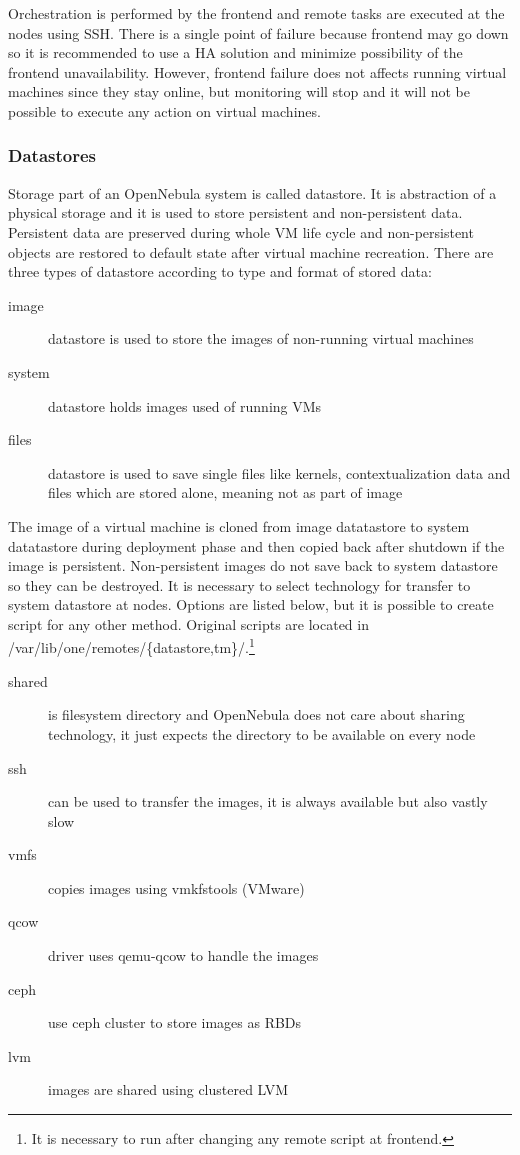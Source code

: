 Orchestration is performed by the frontend and remote tasks are executed at the nodes using \Ac{SSH}. There is a single point of failure because frontend may go down so it is recommended to use a \Ac{HA} solution and minimize possibility of the frontend unavailability. However, frontend failure does not affects running virtual machines since they stay online, but monitoring will stop and it will not be possible to execute any action on virtual machines.

\subsubsection{Datastores}
Storage part of an OpenNebula system is called datastore. It is abstraction of a physical storage and it is used to store persistent and non-persistent data. Persistent data are preserved during whole \Ac{VM} life cycle and non-persistent objects are restored to default state after virtual machine recreation. There are three types of datastore according to type and format of stored data:
\begin{description}
	\item[image] datastore is used to store the images of non-running virtual machines
	\item[system] datastore holds images used of running \Ac{VM}s
	\item[files] datastore is used to save single files like kernels, contextualization data and files which are stored alone, meaning not as part of image
\end{description}

The image of a virtual machine is cloned from image datatastore to system datatastore during deployment phase and then copied back after shutdown if the image is persistent. Non-persistent images do not save back to system datastore so they can be destroyed. It is necessary to select technology for transfer to system datastore at nodes. Options are listed below, but it is possible to create script for any other method. Original scripts are located in /var/lib/one/remotes/\{datastore,tm\}/.\footnote{It is necessary to run  after changing any remote script at frontend.}
\begin{description}
	\item[shared] is filesystem directory and OpenNebula does not care about sharing technology, it just expects the directory to be available on every node
	\item[ssh] can be used to transfer the images, it is always available but also vastly slow
	\item[vmfs] copies images using vmkfstools (VMware)
	\item[qcow] driver uses qemu-qcow to handle the images
	\item[ceph] use ceph cluster to store images as \Ac{RBD}s
	\item[lvm] images are shared using clustered LVM
\end{description}

